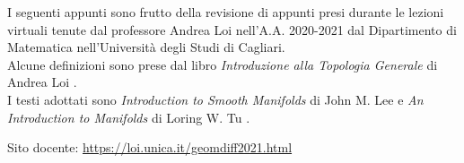 I seguenti appunti sono frutto della revisione di appunti presi durante le lezioni virtuali tenute dal professore Andrea Loi nell'A.A. 2020-2021 dal Dipartimento di Matematica nell'Università degli Studi di Cagliari. \\
Alcune definizioni sono prese dal libro \textit{Introduzione alla Topologia Generale} di Andrea Loi \autocite{loi}.\\
I testi adottati sono \textit{Introduction to Smooth Manifolds} di John M. Lee \cite{lee} e \textit{An Introduction to Manifolds} di Loring W. Tu \cite{tu}.

Sito docente: \url{https://loi.unica.it/geomdiff2021.html}
